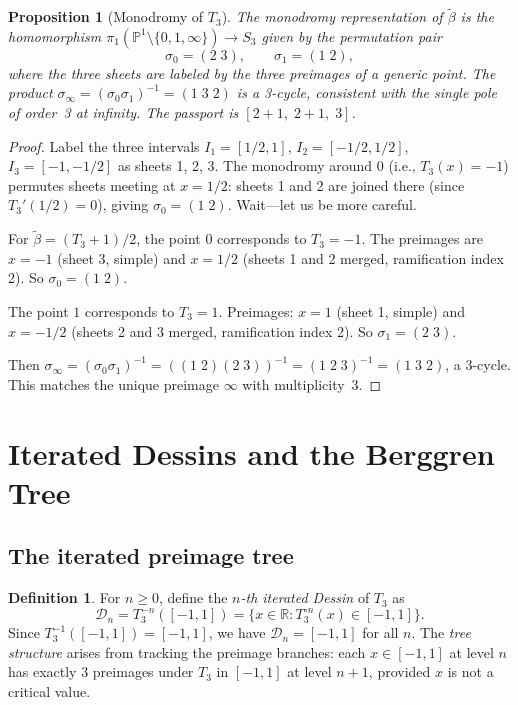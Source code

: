 \documentclass[12pt]{amsart}
\newtheorem{proposition}[theorem]{Proposition}
\theoremstyle{definition}
\newtheorem{definition}[theorem]{Definition}
\theoremstyle{remark}
\newcommand{\RR}{\mathbb{R}}
\newcommand{\PP}{\mathbb{P}}
\begin{document}
\begin{proposition}[Monodromy of $T_3$]\label{prop:monodromy}
The monodromy representation of $\tilde{\beta}$ is the homomorphism
$\pi_1(\PP^1\setminus\{0,1,\infty\}) \to S_3$ given by the
permutation pair
\[
  \sigma_0 = (2\;3), \qquad \sigma_1 = (1\;2),
\]
where the three sheets are labeled by the three preimages of a generic
point.  The product $\sigma_\infty = (\sigma_0\sigma_1)^{-1} = (1\;3\;2)$
is a 3-cycle, consistent with the single pole of order~3 at infinity.
The passport is $[2+1,\; 2+1,\; 3]$.
\end{proposition}

\begin{proof}
Label the three intervals $I_1=[1/2,1]$, $I_2=[-1/2,1/2]$,
$I_3=[-1,-1/2]$ as sheets 1, 2, 3.  The monodromy around $0$
(i.e., $T_3(x)=-1$) permutes sheets meeting at $x=1/2$: sheets 1 and 2
are joined there (since $T_3'(1/2)=0$), giving $\sigma_0=(1\;2)$.
Wait---let us be more careful.

For $\tilde\beta = (T_3+1)/2$, the point $0$ corresponds to $T_3=-1$.
The preimages are $x=-1$ (sheet 3, simple) and $x=1/2$ (sheets 1 and 2
merged, ramification index 2).  So $\sigma_0 = (1\;2)$.

The point $1$ corresponds to $T_3=1$.  Preimages: $x=1$ (sheet 1,
simple) and $x=-1/2$ (sheets 2 and 3 merged, ramification index 2).
So $\sigma_1 = (2\;3)$.

Then $\sigma_\infty = (\sigma_0\sigma_1)^{-1} = ((1\;2)(2\;3))^{-1}
= (1\;2\;3)^{-1} = (1\;3\;2)$, a 3-cycle.  This matches the unique
preimage $\infty$ with multiplicity~3.
\end{proof}


\section{Iterated Dessins and the Berggren Tree}\label{sec:tree}

\subsection{The iterated preimage tree}

\begin{definition}\label{def:iterated-dessin}
For $n\ge 0$, define the \emph{$n$-th iterated Dessin} of $T_3$ as
\[
  \mathcal{D}_n = T_3^{-n}([-1,1]) = \{x\in\RR : T_3^{\circ n}(x)\in[-1,1]\}.
\]
Since $T_3^{-1}([-1,1]) = [-1,1]$, we have $\mathcal{D}_n = [-1,1]$ for
all $n$.  The \emph{tree structure} arises from tracking the preimage
branches: each $x\in[-1,1]$ at level $n$ has exactly 3 preimages under
$T_3$ in $[-1,1]$ at level $n+1$, provided $x$ is not a critical value.
\end{definition}
\end{document}
